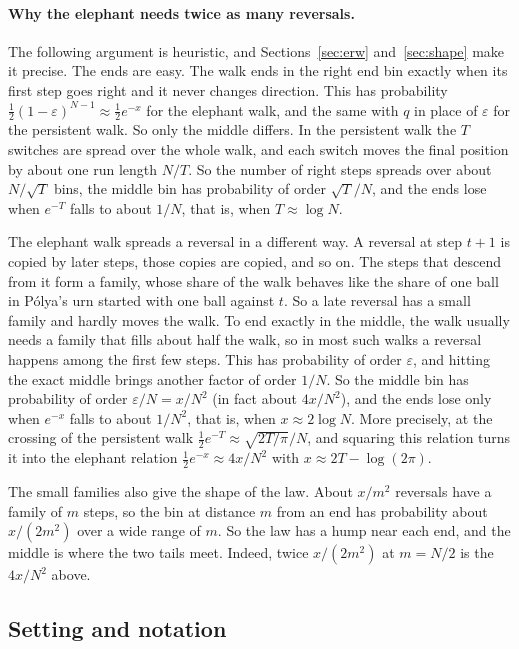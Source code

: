 \paragraph{Why the elephant needs twice as many reversals.}
The following argument is heuristic, and Sections~\ref{sec:erw} and~\ref{sec:shape} make it precise.
The ends are easy. The walk ends in the right end bin exactly when its first
step goes right and it never changes direction. This has probability
$\frac12(1-\varepsilon)^{N-1}\approx\frac12e^{-x}$ for the elephant walk, and
the same with $q$ in place of $\varepsilon$ for the persistent walk. So only the
middle differs. In the persistent walk the $T$ switches are spread over the whole
walk, and each switch moves the final position by about one run length $N/T$. So the
number of right steps spreads over about $N/\sqrt T$ bins, the middle bin has
probability of order $\sqrt T/N$, and the ends lose when $e^{-T}$ falls to
about $1/N$, that is, when $T\approx\log N$.

The elephant walk spreads a reversal in a different way. A reversal at step
$t+1$ is copied by later steps, those copies are copied, and so on. The steps
that descend from it form a family, whose share of the walk behaves like the
share of one ball in P\'olya's urn started with one ball against $t$. So a late
reversal has a small family and hardly moves the walk.
To end exactly in the middle, the walk usually needs a family that fills
about half the walk, so in most such walks a reversal happens among the first few steps. This has probability
of order $\varepsilon$, and hitting the exact middle brings another factor of
order $1/N$. So the middle bin has probability of order $\varepsilon/N=x/N^2$ (in
fact about $4x/N^2$), and the ends lose only when $e^{-x}$ falls to about
$1/N^2$, that is, when $x\approx2\log N$. More precisely, at the crossing of
the persistent walk $\frac12e^{-T}\approx\sqrt{2T/\pi}/N$, and squaring this relation turns it
into the elephant relation $\frac12e^{-x}\approx4x/N^2$ with
$x\approx2T-\log(2\pi)$.

The small families also give the shape of the law. About $x/m^2$ reversals
have a family of $m$ steps, so the bin at distance $m$ from an end has
probability about $x/(2m^2)$ over a wide range of $m$. So the law has a hump
near each end, and the middle is where the two tails meet. Indeed, twice
$x/(2m^2)$ at $m=N/2$ is the $4x/N^2$ above.

\subsection{Setting and notation}\label{sec:notation}


